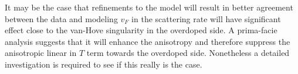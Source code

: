 It may be the case that refinements to the model will result in better agreement between the data and modeling $v_F$ in the scattering rate will have significant effect close to the van-Hove singularity in the overdoped side. A prima-facie analysis suggests that it will enhance the anisotropy and therefore suppress the anisotropic linear in $T$ term towards the overdoped side. Nonetheless a detailed investigation is required to see if this really is the case.




